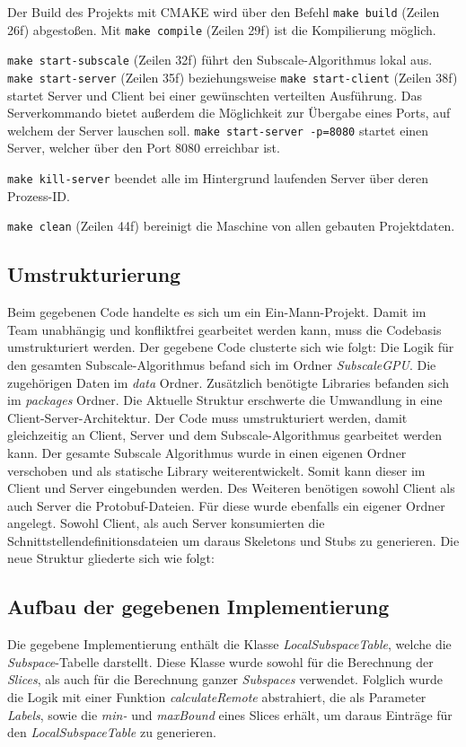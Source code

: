 Der Build des Projekts mit CMAKE wird über den Befehl \verb|make build| (Zeilen 26f) abgestoßen. Mit \verb|make compile|
(Zeilen 29f) ist die Kompilierung möglich.

\verb|make start-subscale| (Zeilen 32f) führt den Subscale-Algorithmus lokal aus. \verb|make start-server| (Zeilen 35f)
beziehungsweise \verb|make start-client| (Zeilen 38f) startet Server und Client bei einer gewünschten verteilten
Ausführung. Das Serverkommando bietet außerdem die Möglichkeit zur Übergabe eines Ports, auf welchem der Server lauschen
soll. \verb|make start-server -p=8080| startet einen Server, welcher über den Port 8080 erreichbar ist.

\verb|make kill-server| beendet alle im Hintergrund laufenden Server über deren Prozess-ID.

\verb|make clean| (Zeilen 44f) bereinigt die Maschine von allen gebauten Projektdaten.

\subsection{Umstrukturierung}
Beim gegebenen Code handelte es sich um ein Ein-Mann-Projekt. Damit im Team unabhängig und konfliktfrei gearbeitet
werden kann, muss die Codebasis umstrukturiert werden. Der gegebene Code clusterte sich wie folgt:
Die Logik für den gesamten Subscale-Algorithmus befand sich im Ordner \textit{SubscaleGPU}. Die zugehörigen Daten im
\textit{data} Ordner. Zusätzlich benötigte Libraries befanden sich im \textit{packages} Ordner. Die Aktuelle Struktur
erschwerte die Umwandlung in eine Client-Server-Architektur. Der Code muss umstrukturiert werden, damit gleichzeitig an
Client, Server und dem Subscale-Algorithmus gearbeitet werden kann. Der gesamte Subscale Algorithmus wurde in einen
eigenen Ordner verschoben und als statische Library weiterentwickelt. Somit kann dieser im Client und Server
eingebunden werden. Des Weiteren benötigen sowohl Client als auch Server die Protobuf-Dateien. Für diese wurde ebenfalls
ein eigener Ordner angelegt. Sowohl Client, als auch Server konsumierten die Schnittstellendefinitionsdateien um daraus
Skeletons und Stubs zu generieren.
Die neue Struktur gliederte sich wie folgt:


\subsection{Aufbau der gegebenen Implementierung}
Die gegebene Implementierung enthält die Klasse \emph{LocalSubspaceTable}, welche die \emph{Subspace}-Tabelle darstellt.
Diese Klasse wurde sowohl für die Berechnung der \emph{Slices}, als auch für die Berechnung ganzer \emph{Subspaces}
verwendet. Folglich wurde die Logik mit einer Funktion \emph{calculateRemote} abstrahiert, die als Parameter
\emph{Labels}, sowie die \emph{min-} und \emph{maxBound} eines Slices erhält, um daraus Einträge für den
\emph{LocalSubspaceTable} zu generieren.

